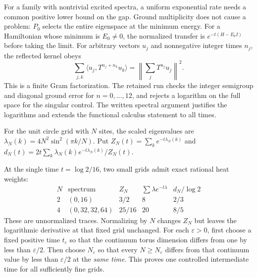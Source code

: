 For a family with nontrivial excited spectra, a uniform exponential rate needs a common positive lower bound on the gap. Ground multiplicity does not cause a problem: $P_0$ selects the entire eigenspace at the minimum energy. For a Hamiltonian whose minimum is $E_0\ne0$, the normalized transfer is $e^{-t(H-E_0I)}$ before taking the limit.
For arbitrary vectors $u_j$ and nonnegative integer times $n_j$, the reflected kernel obeys
\[
\sum_{j,k}\langle u_j,T^{n_j+n_k}u_k\rangle
=\left\|\sum_jT^{n_j}u_j\right\|^2.
\]
This is a finite Gram factorization. The retained run checks the integer semigroup and diagonal ground error for $n=0,\ldots,12$, and rejects a logarithm on the full space for the singular control. The written spectral argument justifies the logarithms and extends the functional calculus statement to all times.

For the unit circle grid with $N$ sites, the scaled eigenvalues are $\lambda_N(k)=4N^2\sin^2(\pi k/N)$. Put $Z_N(t)=\sum_ke^{-t\lambda_N(k)}$ and $d_N(t)=2t\sum_k\lambda_N(k)e^{-t\lambda_N(k)}/Z_N(t)$.

At the single time $t=\log2/16$, two small grids admit exact rational heat weights:
\[
\begin{array}{c|c|c|c|c}
N&\text{spectrum}&Z_N&\sum\lambda e^{-t\lambda}&d_N/\log2\\\hline
2&(0,16)&3/2&8&2/3\\
4&(0,32,32,64)&25/16&20&8/5
\end{array}
\]
These are unnormalized traces. Normalizing by $N$ changes $Z_N$ but leaves the logarithmic derivative at that fixed grid unchanged.
For each $\varepsilon>0$, first choose a fixed positive time $t_\varepsilon$ so that the continuum torus dimension differs from one by less than $\varepsilon/2$. Then choose $N_\varepsilon$ so that every $N\geq N_\varepsilon$ differs from that continuum value by less than $\varepsilon/2$ at the \emph{same time}. This proves one controlled intermediate time for all sufficiently fine grids.

